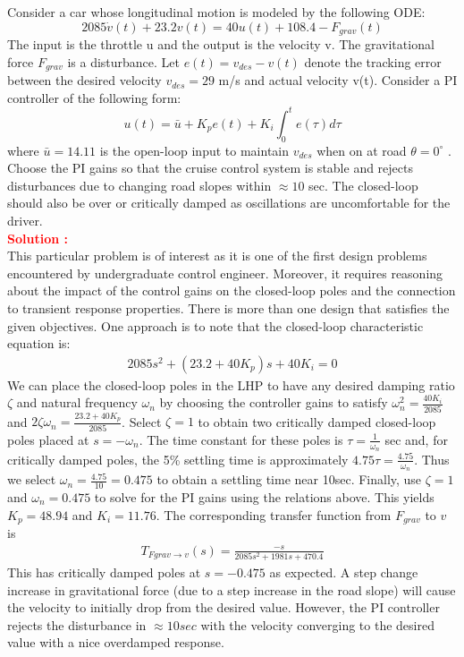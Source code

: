\documentclass[12pt]{article}
\begin{document}
Consider a car whose longitudinal motion is modeled by the following ODE:
$$2085 \dot{v}(t) + 23.2v(t) = 40u(t) + 108.4 - F_{grav}(t)$$
The input is the throttle u and the output is the velocity v. The gravitational force $F_{grav}$ is a disturbance. Let $e(t) = v_{des}- v(t)$ denote the tracking error between the desired velocity $v_{des} = 29$ m/s and actual velocity v(t). Consider a PI controller of the following form:
$$ u(t) =  \bar{u} + K_p e(t) + K_i \int_0^t  e(\tau) d\tau  $$
where $\bar{u}=14.11$ is the open-loop input to maintain $v_{des}$ when on 
at road $\theta= 0^\circ$ . Choose the PI gains so that the cruise control system is stable and rejects disturbances due to changing road slopes within $\approx 10$ sec. The closed-loop should also be over or critically damped as oscillations are uncomfortable for the driver. \\
\textbf{\textcolor{red}{Solution :}} \\
This particular problem is of interest as it is one of the first design problems encountered by undergraduate control engineer. Moreover, it requires reasoning about the impact of the control gains on the closed-loop poles and the connection to transient response properties. There is more than one design that satisfies the given objectives.  One approach is to note that the closed-loop characteristic equation is:
\begin{align*}
 2085 s^2 + (23.2 + 40K_p) s + 40K_i =0
\end{align*}
We can place the closed-loop poles in the LHP to have any desired damping ratio $\zeta$ and natural frequency $\omega_n$ by choosing the controller gains to satisfy $\omega_n^2 = \frac{40K_i}{2085}$
and $2\zeta\omega_n = \frac{23.2+40K_p}{2085}$.  Select $\zeta=1$ to obtain two critically damped closed-loop poles placed at $s=-\omega_n$. The time constant for these poles is $\tau=\frac{1}{\omega_n}$ sec and, for critically damped poles, the 5\% settling time is approximately $4.75\tau = \frac{4.75}{\omega_n}$.  Thus we select $\omega_n = \frac{4.75}{10} = 0.475$ to obtain a settling time near 10sec.  Finally, use $\zeta=1$ and $\omega_n=0.475$ to solve for the PI gains using the relations above. This yields $K_p=48.94$ and $K_i=11.76$.  The corresponding transfer function from $F_{grav}$ to $v$ is
\begin{align*}
    T_{Fgrav \to v}(s) = \frac{-s}{2085 s^2 + 1981 s + 470.4}
\end{align*}
This has critically damped poles at $s=-0.475$ as expected. A step change increase in gravitational force (due to a step increase in the road slope) will cause the velocity to initially drop from the desired value.  However, the PI controller rejects the disturbance in $\approx 10sec$ with the velocity converging to the desired value with a nice overdamped response.
\clearpage
\end{document}
